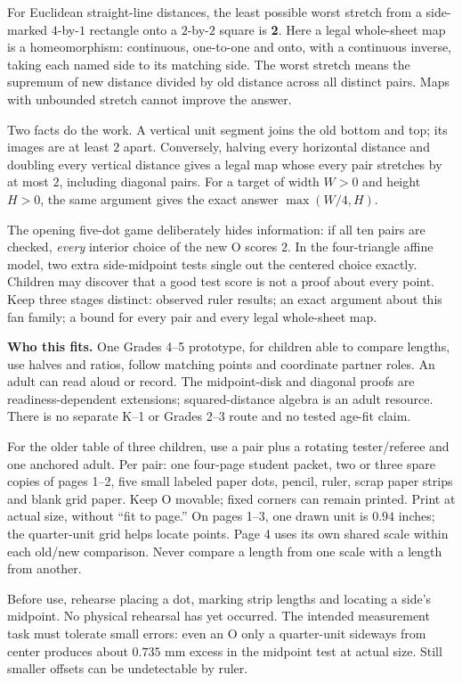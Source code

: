 \documentclass[11pt,letterpaper]{article}
\newcommand{\sect}[1]{\par\vspace{5pt}{\large\bfseries #1}\par}
\begin{document}
\sect{The mathematics first}
For Euclidean straight-line distances, the least possible worst stretch from a
side-marked $4$-by-$1$ rectangle onto a $2$-by-$2$ square is \textbf{2}.
Here a legal whole-sheet map is a homeomorphism: continuous, one-to-one and onto,
with a continuous inverse, taking each named side to its matching side.
The worst stretch means the supremum of new distance divided by old distance
across all distinct pairs. Maps with unbounded stretch cannot improve the answer.

Two facts do the work. A vertical unit segment joins the old bottom and top;
its images are at least $2$ apart. Conversely, halving every horizontal distance
and doubling every vertical distance gives a legal map whose every pair stretches
by at most $2$, including diagonal pairs. For a target of width $W>0$ and height
$H>0$, the same argument gives the exact answer $\max(W/4,H)$.

The opening five-dot game deliberately hides information: if all ten pairs are
checked, \emph{every} interior choice of the new O scores $2$. In the four-triangle
affine model, two extra side-midpoint tests single out the centered choice exactly.
Children may discover that a good test score is not a proof about every point.
Keep three stages distinct: observed ruler results; an exact argument about this
fan family; a bound for every pair and every legal whole-sheet map.

\textbf{Who this fits.} One Grades 4--5 prototype, for children able to compare
lengths, use halves and ratios, follow matching points and coordinate partner roles.
An adult can read aloud or record. The midpoint-disk and diagonal proofs are
readiness-dependent extensions; squared-distance algebra is an adult resource.
There is no separate K--1 or Grades 2--3 route and no tested age-fit claim.

\sect{Materials and preparation}
For the older table of three children, use a pair plus a rotating tester/referee
and one anchored adult. Per pair: one four-page student packet, two or three spare
copies of pages 1--2, five small labeled paper dots, pencil, ruler, scrap paper
strips and blank grid paper. Keep O movable; fixed corners can remain printed.
Print at actual size, without ``fit to page.'' On pages 1--3, one drawn unit is
$0.94$ inches; the quarter-unit grid helps locate points. Page 4 uses its own
shared scale within each old/new comparison. Never compare a length from one
scale with a length from another.

Before use, rehearse placing a dot, marking strip lengths and locating a side's
midpoint. No physical rehearsal has yet occurred. The intended measurement task
must tolerate small errors: even an O only a quarter-unit sideways from center
produces about $0.735$ mm excess in the midpoint test at actual size. Still smaller
offsets can be undetectable by ruler.
\end{document}
